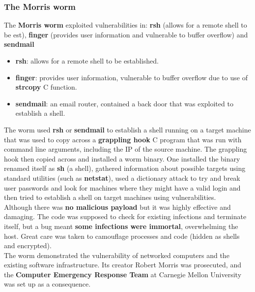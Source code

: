 \documentclass{article}
\newcommand{\np}{\vspace{8pt} \\}
\begin{document}
\subsubsection{The Morris worm}
The \textbf{Morris worm} exploited vulnerabilities in: \textbf{rsh} (allows for a remote shell to be est), \textbf{finger} (provides user information and vulnerable to buffer overflow) and \textbf{sendmail}
\begin{itemize}
	\item \textbf{rsh}: allows for a remote shell to be established.
	\item \textbf{finger}: provides user information, vulnerable to buffer overflow due to use of \textbf{strcopy} C function.
	\item \textbf{sendmail}: an email router, contained a back door that was exploited to establish a shell.
\end{itemize}
The worm used \textbf{rsh} or \textbf{sendmail} to establish a shell running on a target machine that was used to copy across a \textbf{grappling hook} C program that was run with command line arguments, including the IP of the source machine. The grappling hook then copied across and installed a worm binary. One installed the binary renamed itself as \textbf{sh} (a shell), gathered information about possible targets using standard utilities (such as \textbf{netstat}), used a dictionary attack to try and break user passwords and look for machines where they might have a valid login and then tried to establish a shell on target machines using vulnerabilities.
\pagebreak
\\
Although there was \textbf{no malicious payload} but it was highly effective and damaging. The code was supposed to check for existing infections and terminate itself, but a bug meant \textbf{some infections were immortal}, overwhelming the host. Great care was taken to camouflage processes and code (hidden as shells and encrypted). \np
The worm demonstrated the vulnerability of networked computers and the existing software infrastructure. Its creator Robert Morris was prosecuted, and the \textbf{Computer Emergency Response Team} at Carnegie Mellon University was set up as a consequence.
\end{document}
